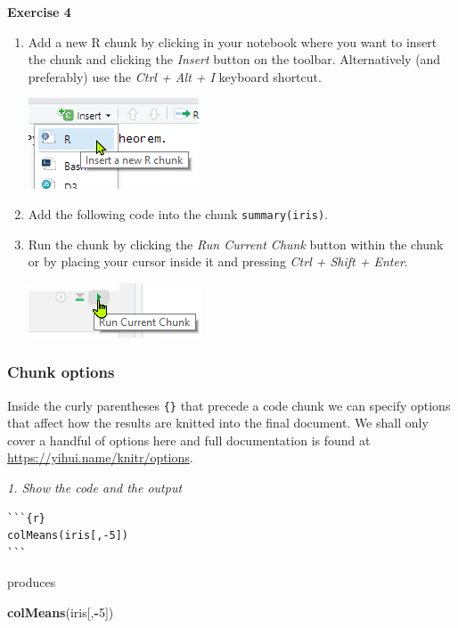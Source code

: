 \documentclass[]{article}
\newenvironment{Shaded}{\begin{snugshade}}{\end{snugshade}}
\newcommand{\DecValTok}[1]{\textcolor[rgb]{0.00,0.00,0.81}{#1}}
\newcommand{\KeywordTok}[1]{\textcolor[rgb]{0.13,0.29,0.53}{\textbf{#1}}}
\newcommand{\NormalTok}[1]{#1}
\newcommand{\OperatorTok}[1]{\textcolor[rgb]{0.81,0.36,0.00}{\textbf{#1}}}
\begin{document}
\textbf{Exercise 4}

\begin{enumerate}
\def\labelenumi{\arabic{enumi}.}
\item
  Add a new R chunk by clicking in your notebook where you want to
  insert the chunk and clicking the \emph{Insert} button on the toolbar.
  Alternatively (and preferably) use the \emph{Ctrl + Alt + I} keyboard
  shortcut.

  \includegraphics{./insertrchunk.png}
\item
  Add the following code into the chunk \texttt{summary(iris)}.
\item
  Run the chunk by clicking the \emph{Run Current Chunk} button within
  the chunk or by placing your cursor inside it and pressing \emph{Ctrl
  + Shift + Enter}.

  \includegraphics{./runchunk.png}
\end{enumerate}

\hypertarget{chunk-options}{%
\subsubsection{Chunk options}\label{chunk-options}}

Inside the curly parentheses \texttt{\{\}} that precede a code chunk we
can specify options that affect how the results are knitted into the
final document. We shall only cover a handful of options here and full
documentation is found at \url{https://yihui.name/knitr/options}.

\emph{1. Show the code and the output}

\begin{verbatim}
```{r}
colMeans(iris[,-5])
```
\end{verbatim}

produces

\begin{Shaded}
\begin{Highlighting}[]
\KeywordTok{colMeans}\NormalTok{(iris[,}\OperatorTok{-}\DecValTok{5}\NormalTok{])}
\end{Highlighting}
\end{Shaded}
\end{document}

